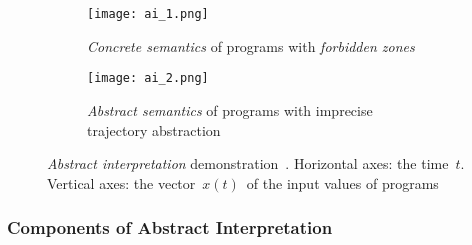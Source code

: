 \begin{figure}[htb]
     \centering

     \begin{subfigure}[htb]{.45 \linewidth}
         \centering
         \texttt{[image: ai\_1.png]}
         \caption{
            \emph{Concrete semantics} of programs with
            \emph{forbidden zones}
        }
         \label{fig:ai1}
     \end{subfigure}
%
     \hfill
%
     \begin{subfigure}[htb]{.45\linewidth}
         \centering
         \texttt{[image: ai\_2.png]}
         \caption{
            \emph{Abstract semantics} of programs with imprecise
            trajectory abstraction
        }
         \label{fig:ai2}
     \end{subfigure}
%
    \caption{
        \emph{Abstract interpretation} demonstration~\cite{AIInNutshellCousot}.
        Horizontal axes: the time~$ t $. Vertical axes: the
        vector~$ x(t) $~of the input values of programs
    }
\end{figure}

\subsubsection*{Components of Abstract Interpretation}

